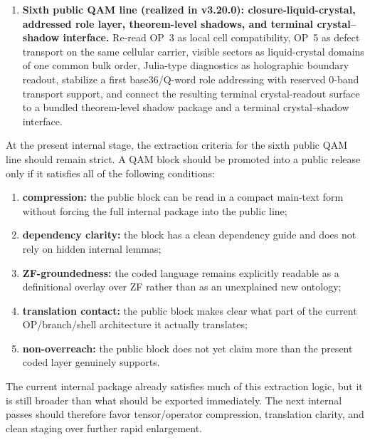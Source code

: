 \begin{enumerate}[leftmargin=2em]
  \item \textbf{Sixth public QAM line (realized in v3.20.0): closure-liquid-crystal, addressed role layer, theorem-level shadows, and terminal crystal--shadow interface.} Re-read OP~3 as local cell compatibility, OP~5 as defect transport on the same cellular carrier, visible sectors as liquid-crystal domains of one common bulk order, Julia-type diagnostics as holographic boundary readout, stabilize a first base36/Q-word role addressing with reserved 0-band transport support, and connect the resulting terminal crystal-readout surface to a bundled theorem-level shadow package and a terminal crystal--shadow interface.
\end{enumerate}

At the present internal stage, the extraction criteria for the sixth public QAM line should remain strict. A QAM block should be promoted into a public release only if it satisfies all of the following conditions:
\begin{enumerate}[leftmargin=2em]
  \item \textbf{compression:} the public block can be read in a compact main-text form without forcing the full internal package into the public line;
  \item \textbf{dependency clarity:} the block has a clean dependency guide and does not rely on hidden internal lemmas;
  \item \textbf{ZF-groundedness:} the coded language remains explicitly readable as a definitional overlay over ZF rather than as an unexplained new ontology;
  \item \textbf{translation contact:} the public block makes clear what part of the current OP/branch/shell architecture it actually translates;
  \item \textbf{non-overreach:} the public block does not yet claim more than the present coded layer genuinely supports.
\end{enumerate}

\begin{remark}
The current internal package already satisfies much of this extraction logic, but it is still broader than what should be exported immediately. The next internal passes should therefore favor tensor/operator compression, translation clarity, and clean staging over further rapid enlargement.
\end{remark}

